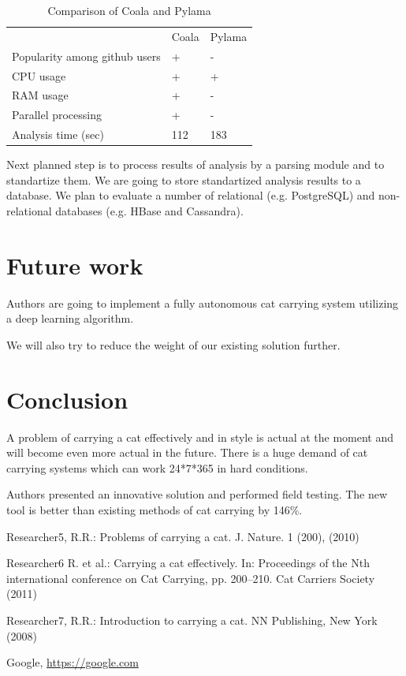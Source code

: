 \documentclass[runningheads,a4paper]{llncs}
\begin{document}
%
\begin{table}
	\caption{\label{tab:compare}Comparison of Coala and Pylama}
	\begin{center}
		\begin{tabular}{p{5cm}|P{2.5cm}|P{2.5cm}}
			\hline
			~                              & Coala & Pylama \\ 
			Popularity among github users  & +     & -      \\ \hline
			CPU usage                      & +    & +      \\ \hline
			RAM usage                      & +    & -      \\ \hline
			Parallel processing            & +     & -      \\ \hline
			Analysis time (sec)            & 112   & 183      \\ \hline
		\end{tabular}
	\end{center}
\end{table}
%

Next planned step is to process results of analysis by a parsing module
and to standartize them. We are going to store standartized analysis results to
a database. We plan to evaluate a number of relational (e.g. PostgreSQL) and
non-relational databases (e.g. HBase and Cassandra).

\section{Future work}

Authors are going to implement a fully autonomous cat carrying system utilizing
a deep learning algorithm.

We will also try to reduce the weight of our existing solution further. 

\section{Conclusion}

A problem of carrying a cat effectively and in style is actual
at the moment and will become even more actual in the future. There is a huge
demand of cat carrying systems which can work 24*7*365 in hard conditions.

Authors presented an innovative solution and performed field testing. The new
tool is better than existing methods of cat carrying by 146\%.

\begin{thebibliography}{4}

 Researcher5, R.R.: Problems of carrying a cat. J. Nature. 1 (200), (2010)

 Researcher6 R. et al.: Carrying a cat
  effectively. In: Proceedings of the Nth international
  conference on Cat Carrying, pp. 200--210. Cat Carriers Society (2011)

 Researcher7, R.R.: Introduction to carrying a cat. NN
  Publishing, New York (2008)
  
 Google, \url{https://google.com}

\end{thebibliography}
\end{document}
